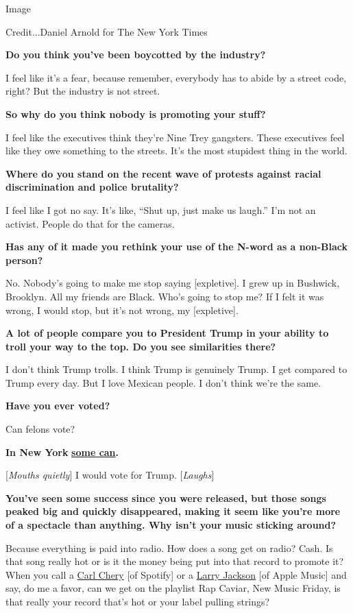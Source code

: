 Image

Credit...Daniel Arnold for The New York Times

\textbf{Do you think you've been boycotted by the industry?}

I feel like it's a fear, because remember, everybody has to abide by a
street code, right? But the industry is not street.

\textbf{So why do you think nobody is promoting your stuff?}

I feel like the executives think they're Nine Trey gangsters. These
executives feel like they owe something to the streets. It's the most
stupidest thing in the world.

\textbf{Where do you stand on the recent wave of protests against racial
discrimination and police brutality?}

I feel like I got no say. It's like, ``Shut up, just make us laugh.''
I'm not an activist. People do that for the cameras.

\textbf{Has any of it made you rethink your use of the N-word as a
non-Black person?}

No. Nobody's going to make me stop saying {[}expletive{]}. I grew up in
Bushwick, Brooklyn. All my friends are Black. Who's going to stop me? If
I felt it was wrong, I would stop, but it's not wrong, my
{[}expletive{]}.

\textbf{A lot of people compare you to President Trump in your ability
to troll your way to the top. Do you see similarities there?}

I don't think Trump trolls. I think Trump is genuinely Trump. I get
compared to Trump every day. But I love Mexican people. I don't think
we're the same.

\textbf{Have you ever voted?}

Can felons vote?

\textbf{In New York}
\textbf{\href{https://www.nytimes3xbfgragh.onion/2018/04/21/us/felony-voting-rights-law.html}{some
can}.}

{[}\emph{Mouths quietly}{]} I would vote for Trump. {[}\emph{Laughs}{]}

\textbf{You've seen some success since you were released, but those
songs peaked big and quickly disappeared, making it seem like you're
more of a spectacle than anything. Why isn't your music sticking
around?}

Because everything is paid into radio. How does a song get on radio?
Cash. Is that song really hot or is it the money being put into that
record to promote it? When you call a
\href{https://www.billboard.com/articles/columns/hip-hop/9374691/spotify-carl-chery-rapcaviar-anniversary}{Carl
Chery} {[}of Spotify{]} or a
\href{https://www.nytimes3xbfgragh.onion/2016/12/22/arts/music/apple-music-platform-promoter-both.html}{Larry
Jackson} {[}of Apple Music{]} and say, do me a favor, can we get on the
playlist Rap Caviar, New Music Friday, is that really your record that's
hot or your label pulling strings?

